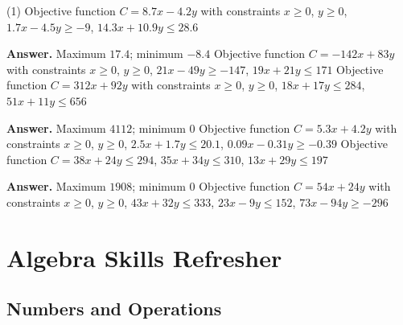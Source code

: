 \documentclass[10pt,]{book}
\theoremstyle{plain}
\theoremstyle{definition}
\theoremstyle{definition}
\theoremstyle{definition}
\numberwithin{equation}{part}
\begin{document}
\begin{exercisegroup}(1)
\exercise[25.]\hypertarget{exercise-29}{}Objective function \(C = 8.7x − 4.2y\) with constraints \(x \ge 0\), \(y \ge 0\), \(1.7x − 4.5y \ge −9\), \(14.3x + 10.9y\le 28.6\)%
\par\smallskip
\noindent\textbf{Answer.}\hypertarget{answer-17}{}\quad
Maximum \(17.4\); minimum \(−8.4\)%
\exercise[26.]\hypertarget{exercise-30}{}Objective function \(C = −142x + 83y\) with constraints \(x \ge 0\), \(y \ge 0\), \(21x − 49y \ge −147\), \(19x + 21y\le 171\)%
\exercise[27.]\hypertarget{exercise-31}{}Objective function \(C = 312x + 92y\) with constraints \(x \ge 0\), \(y \ge 0\), \(18x + 17y \le 284\), \(51x + 11y\le 656\)%
\par\smallskip
\noindent\textbf{Answer.}\hypertarget{answer-18}{}\quad
Maximum \(4112\); minimum \(0\)%
\exercise[28.]\hypertarget{exercise-32}{}Objective function \(C = 5.3x + 4.2y\) with constraints \(x \ge 0\), \(y \ge 0\), \(2.5x + 1.7y \le 20.1\), \(0.09x − 0.31y \ge −0.39\)%
\exercise[29.]\hypertarget{exercise-33}{}Objective function \(C = 38x + 24y \le 294\), \(35x + 34y \le 310\), \(13x + 29y \le 197\)%
\par\smallskip
\noindent\textbf{Answer.}\hypertarget{answer-19}{}\quad
Maximum \(1908\); minimum \(0\)%
\exercise[30.]\hypertarget{exercise-34}{}Objective function \(C = 54x + 24y\) with constraints \(x \ge 0\), \(y \ge 0\), \(43x + 32y \le 333\), \(23x − 9y \le 152\), \(73x − 94y\ge −296\)%
\end{exercisegroup}
\par\smallskip\noindent
%
%
%
\appendix
%
\typeout{************************************************}
\typeout{************************************************}
\chapter[{Algebra Skills Refresher}]{Algebra Skills Refresher}\label{appendix-a}
\typeout{************************************************}
\typeout{************************************************}
\section[{Numbers and Operations}]{Numbers and Operations}\label{Numbers-and-Operations}
\typeout{************************************************}
\typeout{************************************************}
\end{document}
